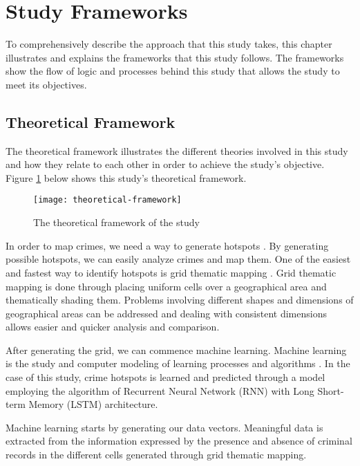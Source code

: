 \section{Study Frameworks}
    To comprehensively describe the approach that this study takes, this chapter illustrates and explains the frameworks that this study follows. The frameworks show the flow of logic and processes behind this study that allows the study to meet its objectives.
\subsection{Theoretical Framework}

The theoretical framework illustrates the different theories involved in this study and how they relate to each other in order to achieve the study's objective. Figure \ref{fig:theoretical-framework} below shows this study's theoretical framework.
\begin{figure}[H]
    \centering
    \texttt{[image: theoretical-framework]}
    \caption{The theoretical framework of the study}
    \label{fig:theoretical-framework}
\end{figure}
In order to map crimes, we need a way to generate hotspots \cite{eck2005mapping}. By generating possible hotspots, we can easily analyze crimes and map them. One of the easiest and fastest way to identify hotspots is grid thematic mapping \cite{chainey2008utility}. Grid thematic mapping is done through placing uniform cells over a geographical area and thematically shading them. Problems involving different shapes and dimensions of geographical areas can be addressed and dealing with consistent dimensions allows easier and quicker analysis and comparison.

After generating the grid, we can commence machine learning. Machine learning is the study and computer modeling of learning processes and algorithms \cite{michalski2013machine}. In the case of this study, crime hotspots is learned and predicted through a model employing the algorithm of Recurrent Neural Network (RNN) with Long Short-term Memory (LSTM) architecture. 

Machine learning starts by generating our data vectors. Meaningful data is extracted from the information expressed by the presence and absence of criminal records in the different cells generated through grid thematic mapping.

